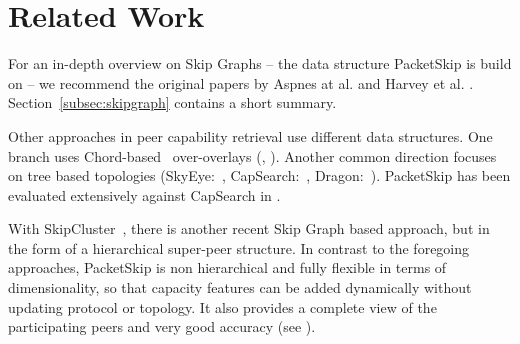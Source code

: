 \section{Related Work}
\label{sec:related}

For an in-depth overview on Skip Graphs -- the data structure PacketSkip is build on -- we recommend the original papers by Aspnes at al. \cite{Aspnes:2007:SG:1290672.1290674} and Harvey et al. \cite{harvey2003skipnet}. Section~\ref{subsec:skipgraph} contains a short summary.

Other approaches in peer capability retrieval use different data structures.
One branch uses Chord-based~\cite{chord} over-overlays (\cite{adaptivechord}, \cite{Kargar2017147}). 
Another common direction focuses on tree based topologies (SkyEye:~\cite{DBLP:conf/icpads/GraffiKXS08}, CapSearch:~\cite{capsearch}, Dragon:~\cite{carlini2016dragon}). PacketSkip has been evaluated extensively against CapSearch in \cite{packetskip10}.

With SkipCluster~\cite{xu2011new}, there is another recent Skip Graph based approach, but in the form of a hierarchical super-peer structure.
In contrast to the foregoing approaches, PacketSkip is non hierarchical and fully flexible in terms of dimensionality, so that capacity features can be added dynamically without updating protocol or topology. It also provides a complete view of the participating peers and very good accuracy (see \cite{packetskip10}).
